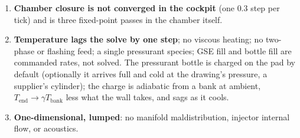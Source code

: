 \documentclass[11pt,a4paper]{article}
\begin{document}
\begin{enumerate}[label=(L\arabic*)]
\item \textbf{Chamber closure is not converged in the cockpit} (one $0.3$ step
      per tick) and is three fixed-point passes in the chamber itself.
\item \textbf{Temperature lags the solve by one step}; no viscous heating; no
      two-phase or flashing feed; a single pressurant species; GSE fill and
      bottle fill are commanded rates, not solved. The pressurant bottle
      is charged on the pad by default (optionally it arrives full and cold
      at the drawing's pressure, a supplier's cylinder); the charge is
      adiabatic from a bank at ambient, $T_{\mathrm{end}}\to\gamma T_{\mathrm{bank}}$
      less what the wall takes, and sags as it cools.
\item \textbf{One-dimensional, lumped}: no manifold maldistribution, injector
      internal flow, or acoustics.
\end{enumerate}

\appendix
\end{document}
